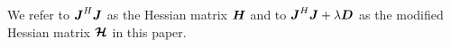 \documentclass[useAMS,usenatbib]{mn2e}
\newcommand{\bJ}{\bmath{J}}
\newcommand{\bD}{\bmath{D}}
\newcommand{\bH}{\bmath{H}}
\newcommand{\bmH}{\bmath{\mathcal{H}}}
\begin{document}
We refer to $\bJ^H\bJ$ as the Hessian matrix $\bH$ and to $\bJ^H\bJ + \lambda\bD$ as the modified Hessian matrix $\bmH$ in this paper. 
% 
\end{document}
